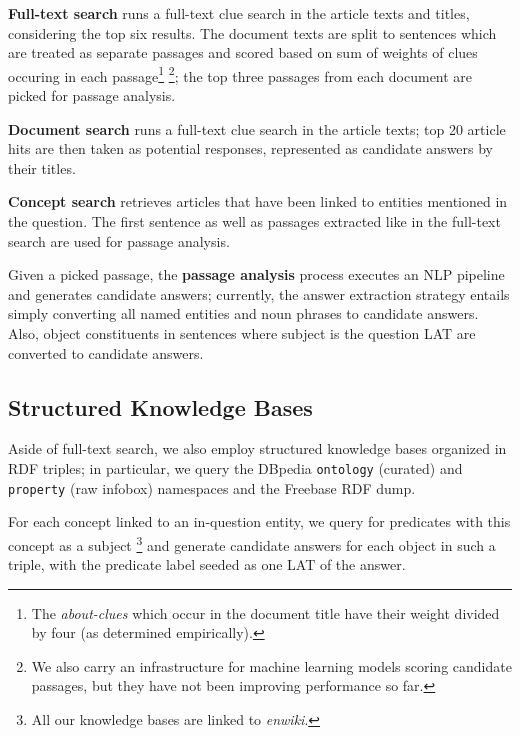 \textbf{Full-text search} \citep{WatsonIR} runs a full-text clue search in the article texts and titles,
considering the top six results.
The document texts are split to sentences which are treated as separate passages
and scored based on sum of weights of clues occuring in each passage\footnote{%
The \textit{about-clues} which occur in the document title have their weight divided by four (as determined empirically).}%
\footnote{We also carry an infrastructure for machine learning models scoring candidate passages,
		but they have not been improving performance so far.};
the top three passages from each document are picked for passage analysis.

\textbf{Document search} \citep{WatsonIR} runs a full-text clue search in the article texts;
top 20 article hits are then taken as potential responses,
represented as candidate answers by their titles.

\textbf{Concept search} retrieves articles that have been linked to entities mentioned in the question.
The first sentence as well as passages extracted like in the full-text search are used for passage analysis.

Given a picked passage, the \textbf{passage analysis} process executes an NLP pipeline and generates candidate answers;
currently, the answer extraction strategy entails simply converting all named entities and noun phrases to candidate answers.
Also, object constituents in sentences where subject is the question LAT are converted to candidate answers.

\subsection{Structured Knowledge Bases}

Aside of full-text search, we also employ structured knowledge bases organized in RDF triples;
in particular, we query the DBpedia \texttt{ontology} (curated) and \texttt{property} (raw infobox)
namespaces and the Freebase RDF dump.

For each concept
linked to an in-question entity, we query for predicates with this concept as a subject%
\footnote{All our knowledge bases are linked to \textit{enwiki}.}
and generate candidate answers for each object in such a triple, with the predicate label seeded as one LAT of the answer.


